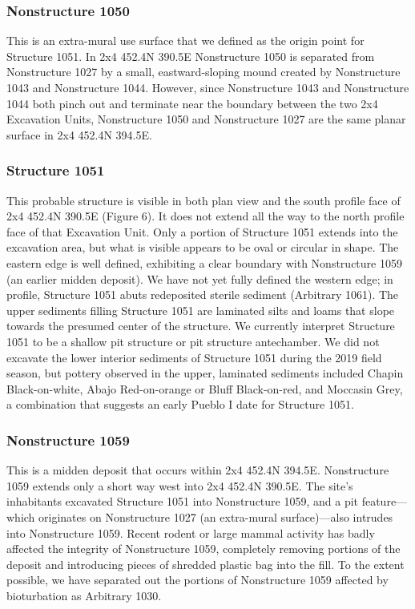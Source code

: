 \documentclass[
  12pt,
]{krantz}
\begin{document}
\hypertarget{nonstructure-1050}{%
\subsubsection{Nonstructure 1050}\label{nonstructure-1050}}

This is an extra-mural use surface that we defined as the origin point
for Structure 1051. In 2x4 452.4N 390.5E Nonstructure 1050 is separated
from Nonstructure 1027 by a small, eastward-sloping mound created by
Nonstructure 1043 and Nonstructure 1044. However, since Nonstructure
1043 and Nonstructure 1044 both pinch out and terminate near the
boundary between the two 2x4 Excavation Units, Nonstructure 1050 and
Nonstructure 1027 are the same planar surface in 2x4 452.4N 394.5E.

\hypertarget{structure-1051}{%
\subsubsection{Structure 1051}\label{structure-1051}}

This probable structure is visible in both plan view and the south
profile face of 2x4 452.4N 390.5E (Figure 6). It does not extend all the
way to the north profile face of that Excavation Unit. Only a portion of
Structure 1051 extends into the excavation area, but what is visible
appears to be oval or circular in shape. The eastern edge is well
defined, exhibiting a clear boundary with Nonstructure 1059 (an earlier
midden deposit). We have not yet fully defined the western edge; in
profile, Structure 1051 abuts redeposited sterile sediment (Arbitrary
1061). The upper sediments filling Structure 1051 are laminated silts
and loams that slope towards the presumed center of the structure. We
currently interpret Structure 1051 to be a shallow pit structure or pit
structure antechamber. We did not excavate the lower interior sediments
of Structure 1051 during the 2019 field season, but pottery observed in
the upper, laminated sediments included Chapin Black-on-white, Abajo
Red-on-orange or Bluff Black-on-red, and Moccasin Grey, a combination
that suggests an early Pueblo I date for Structure 1051.

\hypertarget{nonstructure-1059}{%
\subsubsection{Nonstructure 1059}\label{nonstructure-1059}}

This is a midden deposit that occurs within 2x4 452.4N 394.5E.
Nonstructure 1059 extends only a short way west into 2x4 452.4N 390.5E.
The site's inhabitants excavated Structure 1051 into Nonstructure 1059,
and a pit feature---which originates on Nonstructure 1027 (an
extra-mural surface)---also intrudes into Nonstructure 1059. Recent
rodent or large mammal activity has badly affected the integrity of
Nonstructure 1059, completely removing portions of the deposit and
introducing pieces of shredded plastic bag into the fill. To the extent
possible, we have separated out the portions of Nonstructure 1059
affected by bioturbation as Arbitrary 1030.
\end{document}
